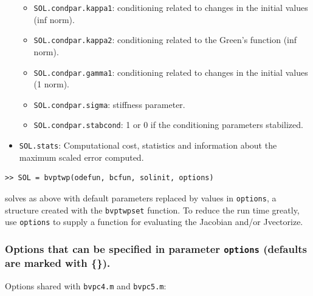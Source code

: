\documentclass{article}
\begin{document}
\begin{itemize}
\begin{itemize}
                           \item \texttt{SOL.condpar.kappa1}: conditioning
                         related to changes in the initial values (inf norm).

                           \item \texttt{SOL.condpar.kappa2}: conditioning
                         related to the Green's function (inf norm).

                           \item \texttt{SOL.condpar.gamma1}: conditioning
                         related to changes in the initial values (1 norm).

                           \item \texttt{SOL.condpar.sigma}: stiffness
                           parameter.

                           \item \texttt{SOL.condpar.stabcond}: 1 or 0 if the
                         conditioning parameters stabilized.
                         \end{itemize}
         \item \texttt{SOL.stats}:  Computational cost, statistics and
         information about the maximum scaled error computed.

\end{itemize}


\begin{verbatim}
>> SOL = bvptwp(odefun, bcfun, solinit, options)
\end{verbatim}

 solves as above with default parameters
 replaced by values in \texttt{options}, a structure created with the
 \texttt{bvptwpset} function. To reduce the run time greatly, use
 \texttt{options} to supply a function for evaluating the Jacobian and/or
 Jvectorize.
 
\subsubsection{Options that can be specified in parameter \texttt{options}
(defaults are marked with \{\}).}

Options shared with \texttt{bvpc4.m} and \texttt{bvpc5.m}:
\end{document}
